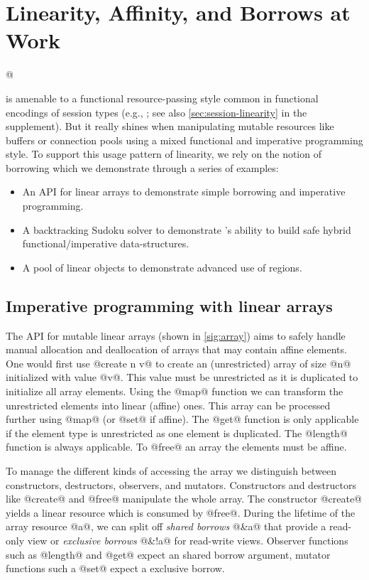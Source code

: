 \section{Linearity, Affinity, and Borrows at Work}
\label{motivation}

\lstMakeShortInline[keepspaces,basicstyle=\small\ttfamily]@

\lang{} is amenable to a functional resource-passing style
common in functional encodings of session types (e.g.,
\cite{DBLP:journals/jfp/Padovani17}; see also
\cref{sec:session-linearity} in the supplement). But it really shines 
when manipulating mutable resources like buffers or connection pools
using a mixed functional and imperative programming style.
%
To support this usage pattern of linearity, we rely on
the notion of borrowing \cite{DBLP:conf/popl/BoylandR05} which
we demonstrate through a series of examples:
\begin{itemize}
\item An API for linear arrays to demonstrate simple borrowing and imperative programming.
\item
  A backtracking Sudoku solver to demonstrate
  \lang's ability to build safe hybrid functional/imperative data-structures.
\item A pool of linear objects to demonstrate advanced use of regions.
\end{itemize}

\subsection{Imperative programming with linear arrays}
\label{sec:imper-progr}

The API for mutable linear arrays (shown in \cref{sig:array})
aims to safely handle manual allocation and
deallocation of arrays that may contain affine elements.
One would first use @create n v@ to create
an (unrestricted) array of size @n@ initialized with value
@v@. This value must be unrestricted as it is duplicated to
initialize all array elements. Using the @map@ function we
can transform the unrestricted elements into linear (affine)
ones. This array can be processed further using @map@ (or @set@ if
affine). The @get@ function is only applicable if the element type
is unrestricted as one element is duplicated. The @length@
function is always applicable. To @free@ an array the elements must be
affine.

To manage the different kinds of accessing the array we distinguish between constructors, destructors,
observers, and mutators.
Constructors and destructors like @create@ and @free@ manipulate the whole
array. %
The constructor
@create@ yields a linear resource which is consumed by @free@.
During the lifetime of the array resource @a@, we can split
off \emph{shared borrows} @&a@ that provide a read-only
view or \emph{exclusive borrows} @&!a@ for read-write views.
Observer functions such as @length@ and @get@ expect an shared borrow
argument, mutator functions such a @set@ expect
a exclusive borrow.


